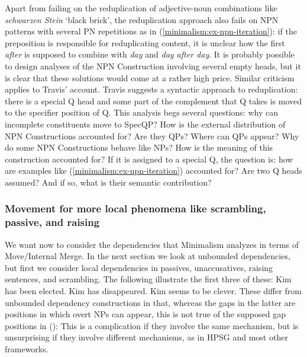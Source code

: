 \documentclass[output=paper,biblatex,babelshorthands,newtxmath,draftmode,colorlinks,citecolor=brown]{langscibook}
\begin{document}
\begin{sloppypar}
Apart from failing on the reduplication of adjective-noun combinations like \emph{schwar\-zen Stein}
`black brick', the reduplication approach also fails on NPN patterns with several PN repetitions as
in (\ref{minimalism:ex-npn-iteration}): if the preposition is responsible for reduplicating content, it is
unclear how the first \emph{after} is supposed to combine with \emph{day} and \emph{day after
  day}. It is probably possible to design analyses of the NPN Construction involving
several empty heads, but it is clear that these solutions would come at a rather high price. Similar
criticism applies to Travis' \citeyearpar{Travis2003a} account. Travis suggests a syntactic approach
to reduplication: there is a special Q head and some part of the complement that Q takes is moved to
the specifier position of Q. This analysis begs several questions: why can incomplete constituents
move to SpecQP? How is the external distribution of NPN Constructions accounted for? Are they QPs?
Where can QPs appear? Why do some NPN Constructions behave like NPs? How is the meaning of this construction accounted
for? If it is assigned to a special Q, the question is: how are examples like
(\ref{minimalism:ex-npn-iteration}) accounted for? Are two Q heads assumed? And if so, what is their
semantic contribution?
\end{sloppypar}


\subsubsection{Movement for more local phenomena like scrambling, passive, and raising}
\label{sec-passive-raising-minimalism}

We want now to consider the dependencies that Minimalism analyzes in terms of Move/Internal
Merge. In the next section we look at unbounded dependencies, but first we consider local
dependencies in passives, unaccusatives, raising sentences, and scrambling. The following illustrate
the first three of these:
\eal\label{ex:min-kim-has-seems}
\ex Kim has been elected.
\ex Kim has disappeared.
\ex Kim seems to be clever.
\zl
These differ from unbounded dependency constructions in that, whereas the gaps in the latter are
positions in which overt NPs can appear, this is not true of the supposed gap positions in ():
\eal
{}
\zl 
This is a complication if they involve the same mechanism, but is unsurprising if they involve
different mechanisms, as in HPSG and most other frameworks.
\end{document}
